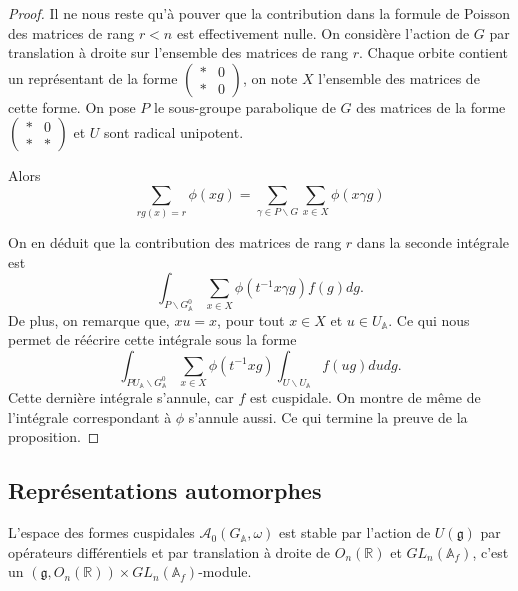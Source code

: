 \begin{proof}
Il ne nous reste qu'à pouver que la contribution dans la formule de Poisson des matrices de rang $r < n$ est effectivement nulle. On considère l'action de $G$ par translation à droite sur l'ensemble des matrices de rang $r$. Chaque orbite contient un représentant de la forme $\begin{pmatrix} 
* & 0 \\
* & 0 
\end{pmatrix}$, on note $X$ l'ensemble des matrices de cette forme. On pose $P$ le sous-groupe parabolique de $G$ des matrices de la forme $\begin{pmatrix} 
* & 0 \\
* & * 
\end{pmatrix}$ et $U$ sont radical unipotent.

Alors
\begin{equation}
\sum_{rg(x)=r}\phi(xg) = \sum_{\gamma \in P \backslash G} \sum_{x \in X} \phi(x \gamma g)
\end{equation}

On en déduit que la contribution des matrices de rang $r$ dans la seconde intégrale est
\begin{equation}
\int_{P \backslash G^0_\mathbb{A}} \sum_{x \in X}{\phi(t^{-1}x\gamma g)} f(g) dg.
\end{equation}
De plus, on remarque que, $xu=x$, pour tout $x \in X$ et $u \in U_\mathbb{A}$. Ce qui nous permet de réécrire cette intégrale sous la forme
\begin{equation}
\int_{PU_\mathbb{A} \backslash G^0_\mathbb{A}} \sum_{x \in X}{\phi(t^{-1}xg)} \int_{U \backslash U_\mathbb{A}} f(ug) du dg.
\end{equation}
Cette dernière intégrale s'annule, car $f$ est cuspidale. On montre de même de l'intégrale correspondant à $\hat{\phi}$ s'annule aussi. Ce qui termine la preuve de la proposition.
\end{proof}

\subsection{Représentations automorphes}

L'espace des formes cuspidales $\mathcal{A}_0(G_\mathbb{A}, \omega)$ est stable par l'action de $U(\mathfrak{g})$ par opérateurs différentiels et par translation à droite de $O_n(\mathbb{R})$ et $GL_n(\mathbb{A}_f)$, c'est un $(\mathfrak{g}, O_n(\mathbb{R})) \times GL_n(\mathbb{A}_f)$-module.

